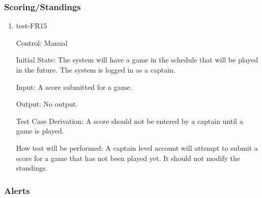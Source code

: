 \documentclass[12pt, titlepage]{article}
\begin{document}
\subsubsection{Scoring/Standings}


\begin{enumerate}

  \item{test-FR15\\}

  Control: Manual

  Initial State: The system will have a game in the schedule that will be played
  in the future. The system is logged in as a captain.
            
  Input: A score submitted for a game.

  Output: No output.

  Test Case Derivation: A score should not be entered by a captain until a game
  is played.

  How test will be performed: A captain level account will attempt to submit a
  score for a game that has not been played yet. It should not modify the
  standings.

\end{enumerate}

\subsubsection{Alerts}

\end{document}
